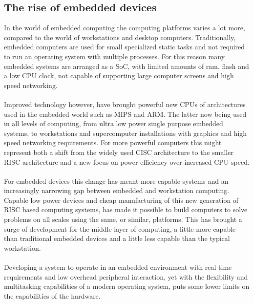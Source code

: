 \subsection{The rise of embedded devices}
In the world of embedded computing the computing platforms varies a lot more,
compared to the world of workstations and desktop computers.
Traditionally, embedded computers are used for small specialized static tasks and
not required to run an operating system with multiple processes.
For this reason many embedded systems are arranged as a SoC,
with limited amounts of ram, flash and a low CPU clock,
not capable of supporting large computer screens and high speed networking.
\\\\
Improved technology however, have brought powerful new CPUs of architectures used in the embedded world
such as MIPS and ARM.
The latter now being used in all levels of computing, from ultra low power single purpose embedded systems,
to workstations and supercomputer installations with graphics and high speed networking requirements.
For more powerful computers this might represent both a shift from the widely used CISC architecture
to the smaller RISC architecture and a new focus on power efficiency over increased CPU speed.
\\\\
For embedded devices this change has meant more capable systems
and an increasingly narrowing gap between embedded and workstation computing.
Capable low power devices and cheap manufacturing of this new generation of RISC based computing systems,
has made it possible to build computers to solve problems on all scales using the same, or similar, platforms.
This has brought a surge of development for the middle layer of computing,
a little more capable than traditional embedded devices and a little less capable than the typical workstation.
\\\\
Developing a system to operate in an embedded environment with real time requirements
and low overhead peripheral interaction,
yet with the flexibility and multitasking capabilities of a modern operating system,
puts some lower limits on the capabilities of the hardware.

